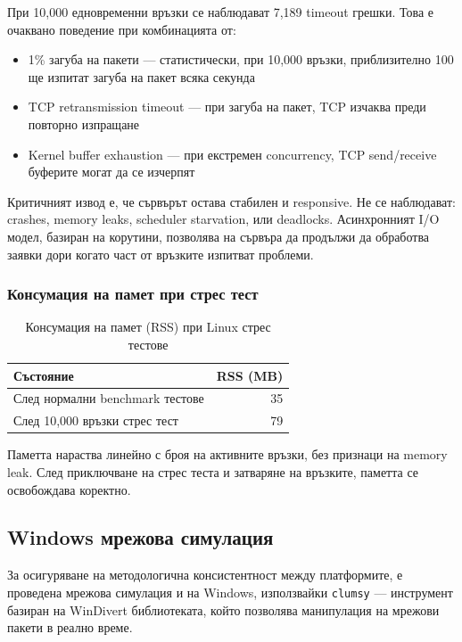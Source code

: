 При 10,000 едновременни връзки се наблюдават 7,189 timeout грешки. Това е очаквано поведение при комбинацията от:
\begin{itemize}
    \item 1\% загуба на пакети --- статистически, при 10,000 връзки, приблизително 100 ще изпитат загуба на пакет всяка секунда
    \item TCP retransmission timeout --- при загуба на пакет, TCP изчаква преди повторно изпращане
    \item Kernel buffer exhaustion --- при екстремен concurrency, TCP send/receive буферите могат да се изчерпят
\end{itemize}

Критичният извод е, че сървърът остава стабилен и responsive. Не се наблюдават: crashes, memory leaks, scheduler starvation, или deadlocks. Асинхронният I/O модел, базиран на корутини, позволява на сървъра да продължи да обработва заявки дори когато част от връзките изпитват проблеми.

\subsubsection{Консумация на памет при стрес тест}

\begin{table}[H]
\centering
\caption{Консумация на памет (RSS) при Linux стрес тестове}
\label{tab:linux_memory}
\begin{tabular}{|l|r|}
\hline
\textbf{Състояние} & \textbf{RSS (MB)} \\
\hline
След нормални benchmark тестове & 35 \\
След 10,000 връзки стрес тест & 79 \\
\hline
\end{tabular}
\end{table}

Паметта нараства линейно с броя на активните връзки, без признаци на memory leak. След приключване на стрес теста и затваряне на връзките, паметта се освобождава коректно.

\subsection{Windows мрежова симулация}

За осигуряване на методологична консистентност между платформите, е проведена мрежова симулация и на Windows, използвайки \texttt{clumsy} \cite{clumsy} --- инструмент базиран на WinDivert библиотеката, който позволява манипулация на мрежови пакети в реално време.

